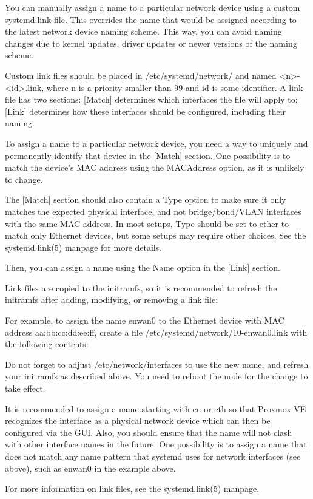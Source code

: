 You can manually assign a name to a particular network device using a custom systemd.link file. This overrides the name that would be assigned according to the latest network device naming scheme. This way, you can avoid naming changes due to kernel updates, driver updates or newer versions of the naming scheme.

Custom link files should be placed in /etc/systemd/network/ and named <n>-<id>.link, where n is a priority smaller than 99 and id is some identifier. A link file has two sections: [Match] determines which interfaces the file will apply to; [Link] determines how these interfaces should be configured, including their naming.

To assign a name to a particular network device, you need a way to uniquely and permanently identify that device in the [Match] section. One possibility is to match the device’s MAC address using the MACAddress option, as it is unlikely to change.

The [Match] section should also contain a Type option to make sure it only matches the expected physical interface, and not bridge/bond/VLAN interfaces with the same MAC address. In most setups, Type should be set to ether to match only Ethernet devices, but some setups may require other choices. See the systemd.link(5) manpage for more details.

Then, you can assign a name using the Name option in the [Link] section.

Link files are copied to the initramfs, so it is recommended to refresh the initramfs after adding, modifying, or removing a link file:

For example, to assign the name enwan0 to the Ethernet device with MAC address aa:bb:cc:dd:ee:ff, create a file /etc/systemd/network/10-enwan0.link with the following contents:

Do not forget to adjust /etc/network/interfaces to use the new name, and refresh your initramfs as described above. You need to reboot the node for the change to take effect.

It is recommended to assign a name starting with en or eth so that Proxmox VE recognizes the interface as a physical network device which can then be configured via the GUI. Also, you should ensure that the name will not clash with other interface names in the future. One possibility is to assign a name that does not match any name pattern that systemd uses for network interfaces (see above), such as enwan0 in the example above.

For more information on link files, see the systemd.link(5) manpage.

